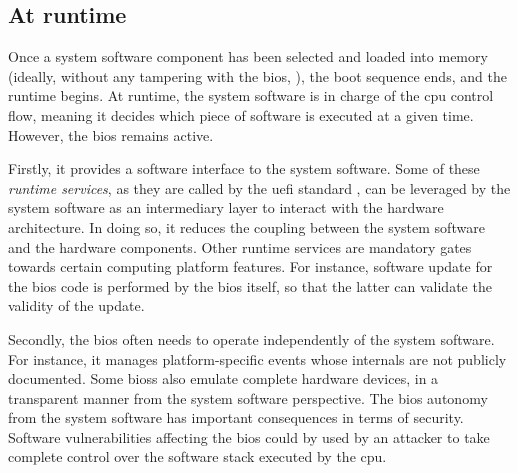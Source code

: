 \subsection{At runtime}
\label{subsec:usecase:firm:runtime}

Once a system software component has been selected and loaded into memory
(ideally, without any tampering with the \ac{bios}, ), the boot sequence ends, and
the runtime begins.
%
At runtime, the system software is in charge of the \ac{cpu} control flow,
meaning it decides which piece of software is executed at a given time.
%
However, the \ac{bios} remains active.

Firstly, it provides a software interface to the system software. 
%
Some of these \emph{runtime services}, as they are called by the \ac{uefi}
standard , can be leveraged by the system software as an intermediary layer to
interact with the hardware architecture.
%
In doing so, it reduces the coupling between the system software and the
hardware components. 
%
Other runtime services are mandatory gates towards certain computing platform
features. 
%
For instance, software update for the \ac{bios} code is performed by the
\ac{bios} itself, so that the latter can validate the validity of the update.

Secondly, the \ac{bios} often needs to operate independently of the system
software. 
%
For instance, it manages platform-specific events whose internals are not
publicly documented.
%
Some \acp{bios} also emulate complete hardware devices, in a transparent manner
from the system software perspective.
%
The \ac{bios} autonomy  from the system software has important consequences in
terms of security.
%
Software vulnerabilities affecting the \ac{bios} could by used by an attacker to
take complete control over the software stack executed by the \ac{cpu}.

